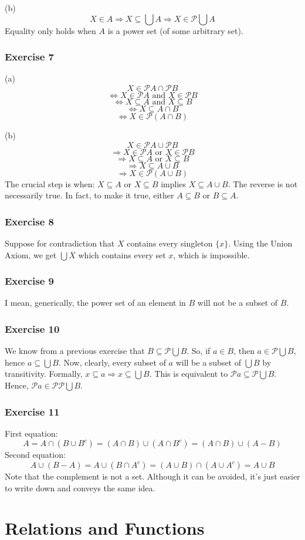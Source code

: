 \documentclass{book}
\begin{document}
\noindent
(b)
$$X \in A \Rightarrow X \subseteq \bigcup A \Rightarrow X \in \mathcal{P} \bigcup A$$
Equality only holds when $A$ is a power set (of some arbitrary set).

\subsection*{Exercise 7}
(a)
$$X \in \mathcal{P} A \cap \mathcal{P} B$$
$$\Leftrightarrow X \in \mathcal{P} A \text{ and } X \in \mathcal{P} B$$
$$\Leftrightarrow X \subseteq A \text{ and } X \subseteq B$$
$$\Leftrightarrow X \subseteq A \cap B$$
$$\Leftrightarrow X \in \mathcal{P} (A \cap B)$$

\noindent
(b)
$$X \in \mathcal{P} A \cup \mathcal{P} B$$
$$\Rightarrow X \in \mathcal{P} A \text{ or } X \in \mathcal{P} B$$
$$\Rightarrow X \subseteq A \text{ or } X \subseteq B$$
$$\Rightarrow X \subseteq A \cup B$$
$$\Rightarrow X \in \mathcal{P} (A \cup B)$$
The crucial step is when: $X \subseteq A \text{ or } X \subseteq B$ implies $X \subseteq A \cup B$. The reverse is not necessarily true. In fact, to make it true, either $A \subseteq B$ or $B \subseteq A$.

\subsection*{Exercise 8}
Suppose for contradiction that $X$ contains every singleton $\{ x \}$. Using the Union Axiom, we get $\bigcup X$ which contains every set $x$, which is impossible.

\subsection*{Exercise 9}
I mean, generically, the power set of an element in $B$ will not be a subset of $B$.

\subsection*{Exercise 10}
We know from a previous exercise that $B \subseteq \mathcal{P} \bigcup B$. So, if $a \in B$, then $a \in \mathcal{P} \bigcup B$, hence $a \subseteq \bigcup B$. Now, clearly, every subset of $a$ will be a subset of $\bigcup B$ by transitivity. Formally, $x \subseteq a \Rightarrow x \subseteq \bigcup B$. This is equivalent to $\mathcal{P} a \subseteq \mathcal{P} \bigcup B$. Hence, $\mathcal{P} a \in \mathcal{P} \mathcal{P} \bigcup B$.

\subsection*{Exercise 11}
First equation:
$$A = A \cap (B \cup B^c) = (A \cap B) \cup (A \cap B^c) = (A \cap B) \cup (A - B)$$
Second equation:
$$A \cup (B - A) = A \cup (B \cap A^c) = (A \cup B) \cap (A \cup A^c) = A \cup B$$
Note that the complement is not a set. Although it can be avoided, it's just easier to write down and conveys the same idea.

\chapter{Relations and Functions}
\end{document}
